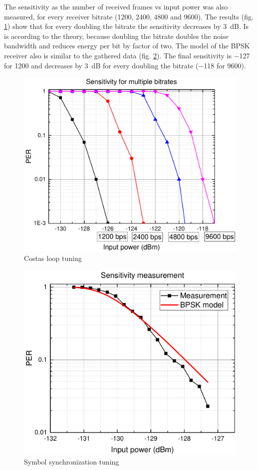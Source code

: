 The sensitivity as the number of received frames vs input power was also measured, for every receiver bitrate (\si{1200}, \si{2400}, \si{4800} and \SI{9600}{\bps}). The results (fig. \ref{sensitivity_tests}) show that for every doubling the bitrate the sensitivity decreases by \SI{3}{\dB}. Is is according to the theory, because doubling the bitrate doubles the noise bandwidth and reduces energy per bit by factor of two. The model of the BPSK receiver also is similar to the gathered data (fig. \ref{sensitivity_test_model}). The final sensitivity is \SI{-127}{\dBm} for \SI{1200}{\bps} and decreases by \SI{3}{\dB} for every doubling the bitrate (\SI{-118}{\dBm} for \SI{9600}{\bps}).

\begin{figure}
    \centering
    \includegraphics[width=0.6\paperwidth]{img/7/sensitivityMG.pdf}
    \caption{Costas loop tuning}
    \label{sensitivity_tests}
\end{figure}

\begin{figure}
    \centering
    \includegraphics[width=0.6\paperwidth]{img/7/sensitivityG.pdf}
    \caption{Symbol synchronization tuning}
    \label{sensitivity_test_model}
\end{figure}
